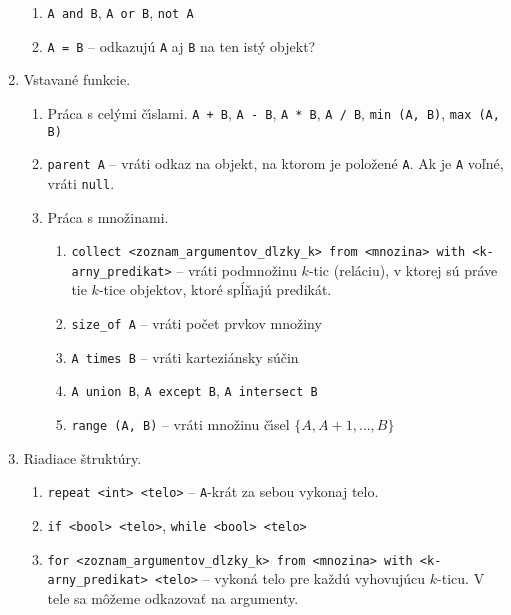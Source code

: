 \documentclass[a4paper,12pt]{article}
\begin{document}
\begin{enumerate}
\begin{enumerate}
        \item \verb|A and B|, \verb|A or B|, \verb|not A|
        \item \verb|A = B| -- odkazuj\'{u} \verb|A| aj \verb|B| na ten ist\'{y} objekt?
    \end{enumerate}
    \item Vstavan\'{e} funkcie.
    \begin{enumerate}
        \item Pr\'{a}ca s cel\'{y}mi \v{c}\'{\i}slami. \verb|A + B|,
        \verb|A - B|, \verb|A * B|, \verb|A / B|, \verb|min (A, B)|,
        \verb|max (A, B)|
        \item \verb|parent A| -- vr\'{a}ti odkaz na objekt, na ktorom je polo\v{z}en\'{e}
        \verb|A|. Ak je \verb|A| vo\v{l}n\'{e}, vr\'{a}ti \verb|null|.
        \item Pr\'{a}ca s mno\v{z}inami.
        \begin{enumerate}
            \item \verb|collect <zoznam_argumentov_dlzky_k> from <mnozina> with <k-arny_predikat>| -- vr\'{a}ti podmno\v{z}inu
            $k$-tic (rel\'{a}ciu), v ktorej s\'{u} pr\'{a}ve tie $k$-tice objektov,
            ktor\'{e} sp\'{l}\v{n}aj\'{u} predik\'{a}t.
            \item \verb|size_of A| -- vr\'{a}ti po\v{c}et prvkov mno\v{z}iny
            \item \verb|A times B| -- vr\'{a}ti kartezi\'{a}nsky s\'{u}\v{c}in
            \item \verb|A union B|, \verb|A except B|, \verb|A intersect B|
            \item \verb|range (A, B)| -- vr\'{a}ti mno\v{z}inu \v{c}\'{\i}sel $\lbrace A, A+1, \ldots, B\rbrace$
        \end{enumerate}
    \end{enumerate}
    \item Riadiace \v{s}trukt\'{u}ry.
    \begin{enumerate}
        \item \verb|repeat <int> <telo>| -- \verb|A|-kr\'{a}t za sebou vykonaj
        telo.
        \item \verb|if <bool> <telo>|, \verb|while <bool> <telo>|
        \item \verb|for <zoznam_argumentov_dlzky_k> from <mnozina> with <k-arny_predikat> <telo>| --
        vykon\'{a} telo pre ka\v{z}d\'{u} vyhovuj\'{u}cu $k$-ticu. V tele
        sa m\^{o}\v{z}eme odkazova\v{t} na argumenty.
    \end{enumerate}

\end{enumerate}
\end{document}

